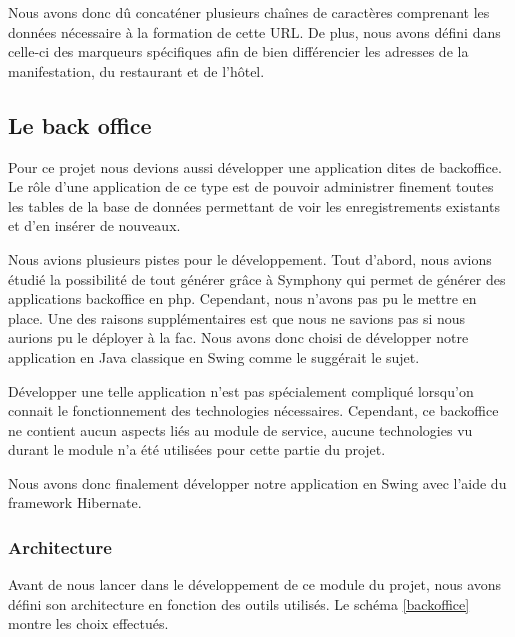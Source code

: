 \documentclass[11pt,a4paper]{article}
\begin{document}
Nous avons donc dû concaténer plusieurs chaînes de caractères comprenant les
données nécessaire à la formation de cette URL. De plus, nous avons défini dans
celle-ci des marqueurs spécifiques afin de bien différencier les adresses de la
manifestation, du restaurant et de l'hôtel.
\clearpage
\subsection{Le back office}

Pour ce projet nous devions aussi développer une application dites de
backoffice. Le rôle d'une application de ce type est de pouvoir administrer
finement toutes les tables de la base de données permettant de voir les
enregistrements existants et d'en insérer de nouveaux.


Nous avions plusieurs pistes pour le développement. Tout d'abord, nous avions
étudié la possibilité de tout générer grâce à Symphony qui permet de générer des
applications backoffice en php. Cependant, nous n'avons pas pu le mettre en
place. Une des raisons supplémentaires est que nous ne savions pas si nous
aurions pu le déployer à la fac. Nous avons donc choisi de développer notre
application en Java classique en Swing comme le suggérait le sujet.



Développer une telle application n'est pas spécialement compliqué lorsqu'on
connait le fonctionnement des technologies nécessaires. Cependant, ce
backoffice ne contient aucun aspects liés au module de service, aucune
technologies vu durant le module n'a été utilisées pour cette partie du projet.


Nous avons donc finalement développer notre application en Swing avec l'aide du
framework Hibernate.



\subsubsection{Architecture}

Avant de nous lancer dans le développement de ce module du projet, nous avons
défini son architecture en fonction des outils utilisés. Le schéma
\ref{backoffice} montre les choix effectués.
\end{document}
